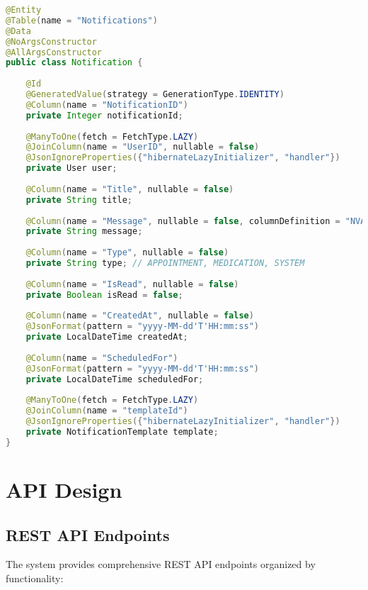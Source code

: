 \documentclass[12pt,a4paper]{article}
\begin{document}
\begin{lstlisting}[language=Java, caption=Notification Entity]
@Entity
@Table(name = "Notifications")
@Data
@NoArgsConstructor
@AllArgsConstructor
public class Notification {
    
    @Id
    @GeneratedValue(strategy = GenerationType.IDENTITY)
    @Column(name = "NotificationID")
    private Integer notificationId;
    
    @ManyToOne(fetch = FetchType.LAZY)
    @JoinColumn(name = "UserID", nullable = false)
    @JsonIgnoreProperties({"hibernateLazyInitializer", "handler"})
    private User user;
    
    @Column(name = "Title", nullable = false)
    private String title;
    
    @Column(name = "Message", nullable = false, columnDefinition = "NVARCHAR(MAX)")
    private String message;
    
    @Column(name = "Type", nullable = false)
    private String type; // APPOINTMENT, MEDICATION, SYSTEM
    
    @Column(name = "IsRead", nullable = false)
    private Boolean isRead = false;
    
    @Column(name = "CreatedAt", nullable = false)
    @JsonFormat(pattern = "yyyy-MM-dd'T'HH:mm:ss")
    private LocalDateTime createdAt;
    
    @Column(name = "ScheduledFor")
    @JsonFormat(pattern = "yyyy-MM-dd'T'HH:mm:ss")
    private LocalDateTime scheduledFor;
    
    @ManyToOne(fetch = FetchType.LAZY)
    @JoinColumn(name = "templateId")
    @JsonIgnoreProperties({"hibernateLazyInitializer", "handler"})
    private NotificationTemplate template;
}
\end{lstlisting}

\section{API Design}

\subsection{REST API Endpoints}

The system provides comprehensive REST API endpoints organized by functionality:
\end{document}
